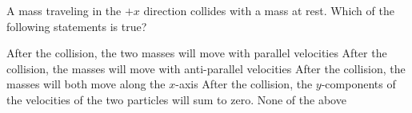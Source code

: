 \documentclass{../../oss-apphys-exam}
\begin{document}
\begin{multicols*}{2}
\begin{questions}
%
%

    \question A mass traveling in the $+x$ direction collides with a mass at
    rest. Which of the following statements is true?
    \begin{choices}
      \choice After the collision, the two masses will move with parallel
      velocities
      \choice After the collision, the masses will move with anti-parallel
      velocities
      \choice After the collision, the masses will both move along the $x$-axis
      \choice After the collision, the $y$-components of the velocities of the
      two particles will sum to zero.
      \choice None of the above
    \end{choices}
    

\end{questions}
\end{multicols*}
\end{document}
